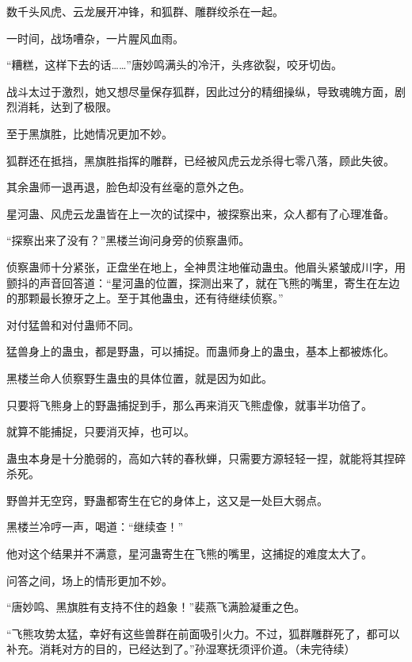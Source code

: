 \begin{this_body}
数千头风虎、云龙展开冲锋，和狐群、雕群绞杀在一起。

一时间，战场嘈杂，一片腥风血雨。

“糟糕，这样下去的话……”唐妙鸣满头的冷汗，头疼欲裂，咬牙切齿。

战斗太过于激烈，她又想尽量保存狐群，因此过分的精细操纵，导致魂魄方面，剧烈消耗，达到了极限。

至于黑旗胜，比她情况更加不妙。

狐群还在抵挡，黑旗胜指挥的雕群，已经被风虎云龙杀得七零八落，顾此失彼。

其余蛊师一退再退，脸色却没有丝毫的意外之色。

星河蛊、风虎云龙蛊皆在上一次的试探中，被探察出来，众人都有了心理准备。

“探察出来了没有？”黑楼兰询问身旁的侦察蛊师。

侦察蛊师十分紧张，正盘坐在地上，全神贯注地催动蛊虫。他眉头紧皱成川字，用颤抖的声音回答道：“星河蛊的位置，探测出来了，就在飞熊的嘴里，寄生在左边的那颗最长獠牙之上。至于其他蛊虫，还有待继续侦察。”

对付猛兽和对付蛊师不同。

猛兽身上的蛊虫，都是野蛊，可以捕捉。而蛊师身上的蛊虫，基本上都被炼化。

黑楼兰命人侦察野生蛊虫的具体位置，就是因为如此。

只要将飞熊身上的野蛊捕捉到手，那么再来消灭飞熊虚像，就事半功倍了。

就算不能捕捉，只要消灭掉，也可以。

蛊虫本身是十分脆弱的，高如六转的春秋蝉，只需要方源轻轻一捏，就能将其捏碎杀死。

野兽并无空窍，野蛊都寄生在它的身体上，这又是一处巨大弱点。

黑楼兰冷哼一声，喝道：“继续查！”

他对这个结果并不满意，星河蛊寄生在飞熊的嘴里，这捕捉的难度太大了。

问答之间，场上的情形更加不妙。

“唐妙鸣、黑旗胜有支持不住的趋象！”裴燕飞满脸凝重之色。

“飞熊攻势太猛，幸好有这些兽群在前面吸引火力。不过，狐群雕群死了，都可以补充。消耗对方的目的，已经达到了。”孙湿寒抚须评价道。（未完待续）

\end{this_body}

